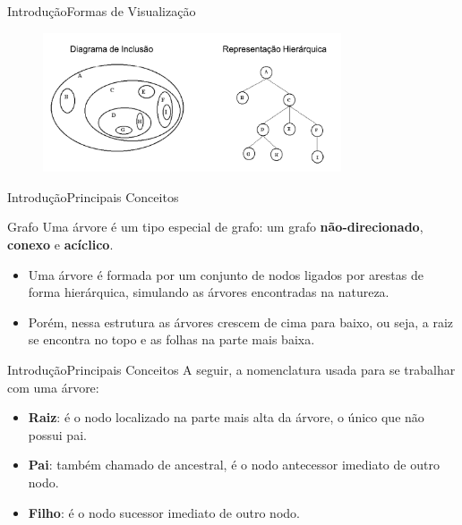 \documentclass[aspectratio=169]{beamer}
\begin{document}
\begin{frame}{Introdução}{Formas de Visualização}
\begin{figure}[!h]
  \centering
   \includegraphics[width=250pt]{imagens/visualizacao.png}
  \label{fig_visualizacao}
\end{figure}
\end{frame}


\begin{frame}{Introdução}{Principais Conceitos}
\begin{block}{Grafo}
 Uma árvore é um tipo especial de grafo: um grafo {\bf não-direcionado}, {\bf conexo} e {\bf acíclico}. 
\end{block}
\begin{itemize}
 \item Uma árvore é formada por um conjunto de nodos ligados por arestas de forma hierárquica, simulando as árvores encontradas na natureza.
 \item Porém, nessa estrutura as árvores crescem de cima para baixo, ou seja, a raiz se encontra no topo e as folhas na parte mais baixa. 
\end{itemize}
\end{frame}

\begin{frame}{Introdução}{Principais Conceitos}
A seguir, a nomenclatura usada para se trabalhar com uma árvore:
\begin{itemize}
 \item {\bf Raiz}: é o nodo localizado na parte mais alta da árvore, o único que não possui pai.
 \item {\bf Pai}: também chamado de ancestral, é o nodo antecessor imediato de outro nodo.
 \item {\bf Filho}: é o nodo sucessor imediato de outro nodo.
\end{itemize}
\end{frame}
\end{document}
